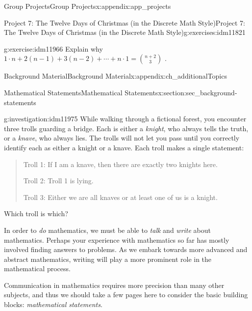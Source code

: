 \documentclass[oneside,10pt,]{book}
\numberwithin{equation}{chapter}
\begin{document}
\begin{appendixptx}{Group Projects}{}{Group Projects}{}{}{x:appendix:app_projects}
\begin{exercises-section-numberless}{Project 7: The Twelve Days of Christmas (in the Discrete Math Style)}{}{Project 7: The Twelve Days of Christmas (in the Discrete Math Style)}{}{}{g:exercises:idm11821}
\begin{divisionexercise}{6}{}{}{g:exercise:idm11966}%
Explain why \(1 \cdot n + 2\left( n - 1 \right) + 3\left( n - 2 \right) + \cdots + n \cdot 1 =
\binom{n + 2}{3}\) .%
\end{divisionexercise}%
\end{exercises-section-numberless}
\end{appendixptx}
%
%
\typeout{************************************************}
\typeout{************************************************}
%
\begin{appendixptx}{Background Material}{}{Background Material}{}{}{x:appendix:ch_additionalTopics}
%
%
\typeout{************************************************}
\typeout{************************************************}
%
\begin{sectionptx}{Mathematical Statements}{}{Mathematical Statements}{}{}{x:section:sec_background-statements}
\begin{introduction}{}%
\begin{investigation}{}{g:investigation:idm11975}%
While walking through a fictional forest, you encounter three trolls guarding a bridge. Each is either a \emph{knight}, who always tells the truth, or a \emph{knave}, who always lies. The trolls will not let you pass until you correctly identify each as either a knight or a knave. Each troll makes a single statement:%
\begin{quote}%
Troll 1: If I am a knave, then there are exactly two knights here.%
\par
Troll 2: Troll 1 is lying.%
\par
Troll 3: Either we are all knaves or at least one of us is a knight.%
\end{quote}
Which troll is which?  %
\end{investigation}
In order to \emph{do} mathematics, we must be able to \emph{talk} and \emph{write} about mathematics. Perhaps your experience with mathematics so far has mostly involved finding answers to problems. As we embark towards more advanced and abstract mathematics, writing will play a more prominent role in the mathematical process.%
\par
Communication in mathematics requires more precision than many other subjects, and thus we should take a few pages here to consider the basic building blocks: \emph{mathematical statements}.%

\end{introduction}
\end{sectionptx}
\end{appendixptx}
\end{document}
